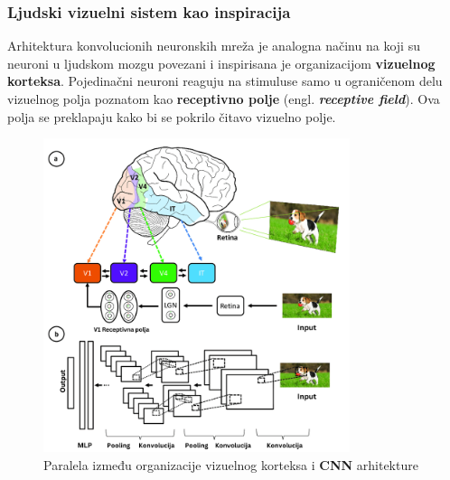 \documentclass[12pt]{article}
\begin{document}
   \subsubsection{Ljudski vizuelni sistem kao inspiracija}
   Arhitektura konvolucionih neuronskih mreža je analogna načinu na koji su neuroni u
   ljudskom mozgu povezani i inspirisana je organizacijom \textbf{vizuelnog korteksa}. 
   Pojedinačni neuroni reaguju na stimuluse samo u ograničenom delu vizuelnog polja 
   poznatom kao \textbf{receptivno polje} (engl. \textbf{\textit{receptive field}}). 
   Ova polja se preklapaju kako bi se pokrilo čitavo vizuelno polje.


   \begin{figure}[h!]
      \centering
      \vspace{1.5cm} %
      \includegraphics[width=0.8\textwidth]{visual_cortex.png}
      \caption{Paralela između organizacije vizuelnog korteksa i \textbf{CNN} arhitekture}
      \label{fig:visual_cortex}
   \end{figure}

   \newpage
\end{document}
